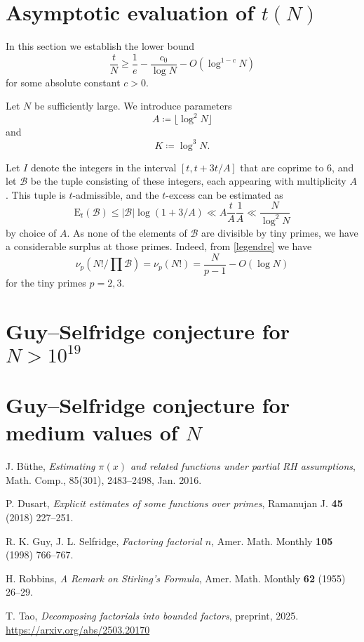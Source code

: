 \documentclass[12pt,a4paper,reqno]{amsart}
\numberwithin{equation}{section}
\theoremstyle{plain}
\theoremstyle{definition}
\newcommand\tuple{{\mathcal B}}
\newcommand\excess{{\mathrm{E}}}
\begin{document}
\section{Asymptotic evaluation of $t(N)$}

In this section we establish the lower bound
$$ \frac{t}{N} \geq \frac{1}{e} - \frac{c_0}{\log N} - O(\log^{1-c} N)$$
for some absolute constant $c>0$.

Let $N$ be sufficiently large.  We introduce parameters
$$ A \coloneqq \lfloor \log^2 N \rfloor$$
and
$$ K \coloneqq \log^3 N.$$

Let $I$ denote the integers in the interval $[t, t+3t/A]$ that are coprime to $6$, and let $\tuple$ be the tuple consisting of these integers, each appearing with multiplicity $A$.  This tuple is $t$-admissible, and the $t$-excess can be estimated as
$$ \excess_t(\tuple) \leq |\tuple| \log(1+3/A) \ll A \frac{t}{A} \frac{1}{A} \ll \frac{N}{\log^2 N}$$
by choice of $A$.  As none of the elements of $\tuple$ are divisible by tiny primes, we have a considerable surplus at those primes.  Indeed, from \eqref{legendre} we have
$$ \nu_p(N!/\prod \tuple) = \nu_p(N!) = \frac{N}{p-1} - O(\log N)$$
for the tiny primes $p=2,3$.





\section{Guy--Selfridge conjecture for $N > 10^{19}$}


\section{Guy--Selfridge conjecture for medium values of $N$}



\begin{thebibliography}{10}

J. B\"uthe, \emph{Estimating $\pi(x)$ and related functions under partial RH assumptions}, Math. Comp., 85(301), 2483--2498, Jan. 2016.

P. Dusart, \emph{Explicit estimates of some functions over primes}, Ramanujan J. \textbf{45} (2018) 227--251.

R. K. Guy, J. L. Selfridge, \emph{Factoring factorial $n$}, Amer. Math. Monthly \textbf{105} (1998) 766--767.

H. Robbins, \emph{A Remark on Stirling's Formula}, Amer. Math. Monthly \textbf{62} (1955) 26--29.

T. Tao, \emph{Decomposing factorials into bounded factors}, preprint, 2025. \url{https://arxiv.org/abs/2503.20170}

\end{thebibliography}
\end{document}
